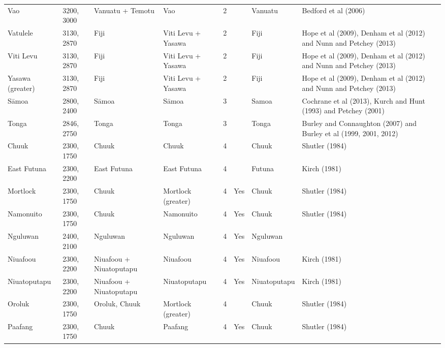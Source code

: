 \begin{longtable}{p{2cm}p{2cm}p{2cm}p{2cm}p{2cm}p{2cm}p{2cm}p{2cm}p{2cm}}
  Vao & 3200, 3000 & Vanuatu + Temotu & Vao & 2 &  & Vanuatu & Bedford et al (2006) & \citet{rieth_cochrane_2018} \\ 
  Vatulele & 3130, 2870 & Fiji & Viti Levu + Yasawa & 2 &  & Fiji & Hope et al (2009), Denham et al (2012) and Nunn and Petchey (2013) & \citet{rieth_cochrane_2018} \\ 
  Viti Levu & 3130, 2870 & Fiji & Viti Levu + Yasawa & 2 &  & Fiji & Hope et al (2009), Denham et al (2012) and Nunn and Petchey (2013) & \citet{rieth_cochrane_2018} \\ 
  Yasawa (greater) & 3130, 2870 & Fiji & Viti Levu + Yasawa & 2 &  & Fiji & Hope et al (2009), Denham et al (2012) and Nunn and Petchey (2013) & \citet{rieth_cochrane_2018} \\ 
  Sāmoa & 2800, 2400 & Sāmoa & Sāmoa & 3 &  & Samoa & Cochrane et al (2013), Kurch and Hunt (1993) and Petchey (2001) & \citet{rieth_cochrane_2018} \\ 
  Tonga & 2846, 2750 & Tonga & Tonga & 3 &  & Tonga & Burley and Connaughton (2007) and Burley et al (1999, 2001, 2012) & \citet{rieth_cochrane_2018} \\ 
  Chuuk & 2300, 1750 & Chuuk & Chuuk & 4 &  & Chuuk & Shutler (1984) & \citet{rieth_cochrane_2018} \\ 
  East Futuna & 2300, 2200 & East Futuna & East Futuna & 4 &  & Futuna & Kirch (1981) & \citet{rieth_cochrane_2018} \\ 
  Mortlock & 2300, 1750 & Chuuk & Mortlock (greater) & 4 & Yes & Chuuk & Shutler (1984) & \citet{rieth_cochrane_2018} \\ 
  Namonuito & 2300, 1750 & Chuuk & Namonuito & 4 & Yes & Chuuk & Shutler (1984) & \citet{rieth_cochrane_2018} \\ 
  Nguluwan & 2400, 2100 & Nguluwan & Nguluwan & 4 & Yes & Nguluwan & \citet{Napolitano_et_al_yap} &  \\ 
  Niuafoou & 2300, 2200 & Niuafoou + Niuatoputapu & Niuafoou & 4 & Yes & Niuafoou & Kirch (1981) & \citet{rieth_cochrane_2018} \\ 
  Niuatoputapu & 2300, 2200 & Niuafoou + Niuatoputapu & Niuatoputapu & 4 & Yes & Niuatoputapu & Kirch (1981) & \citet{rieth_cochrane_2018} \\ 
  Oroluk & 2300, 1750 & Oroluk, Chuuk & Mortlock (greater) & 4 &  & Chuuk & Shutler (1984) & \citet{rieth_cochrane_2018} \\ 
  Paafang & 2300, 1750 & Chuuk & Paafang & 4 & Yes & Chuuk & Shutler (1984) & \citet{rieth_cochrane_2018} \\ 

\end{longtable}
